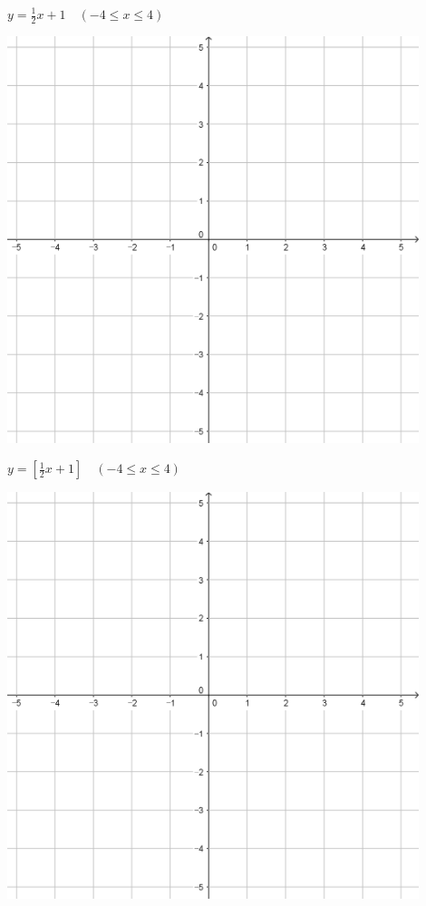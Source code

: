 \documentclass[a4paper]{oblivoir}
\begin{document}
\newpage
\begin{minipage}{0.45\textwidth}\centering
\(y=\frac12x+1\quad(-4\le x\le4)\)
\par\bigskip\includegraphics[width=0.9\textwidth]{55}
\end{minipage}
\begin{minipage}{0.45\textwidth}\centering
\(y=[\frac12x+1]\quad(-4\le x\le4)\)
\par\bigskip\includegraphics[width=0.9\textwidth]{55}
\end{minipage}\bigskip\bigskip\par
\end{document}

